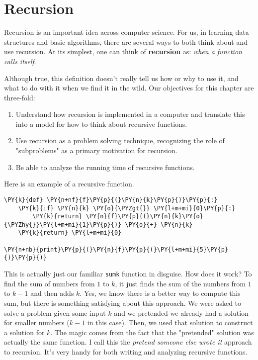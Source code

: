 \chapter{Recursion}


Recursion is an important idea across computer science.
For us, in learning data structures and basic algorithms, there are several ways to both think about and use recursion.
At its simplest, one can think of \textbf{recursion} as: \emph{when a function calls itself}.


Although true, this definition doesn't really tell us how or why to use it, and what to do with it when we find it in the wild.
Our objectives for this chapter are three-fold:

\begin{enumerate}

\item 

Understand how recursion is implemented in a computer and translate this into a model for how to think about recursive functions.



\item 

Use recursion as a problem solving technique, recognizing the role of "subproblems" as a primary motivation for recursion.



\item 

Be able to analyze the running time of recursive functions.



\end{enumerate}

Here is an example of a recursive function.

\begin{Verbatim}[commandchars=\\\{\}]
\PY{k}{def} \PY{n+nf}{f}\PY{p}{(}\PY{n}{k}\PY{p}{)}\PY{p}{:}
    \PY{k}{if} \PY{n}{k} \PY{o}{\PYZgt{}} \PY{l+m+mi}{0}\PY{p}{:}
        \PY{k}{return} \PY{n}{f}\PY{p}{(}\PY{n}{k}\PY{o}{\PYZhy{}}\PY{l+m+mi}{1}\PY{p}{)} \PY{o}{+} \PY{n}{k}
    \PY{k}{return} \PY{l+m+mi}{0}

\PY{n+nb}{print}\PY{p}{(}\PY{n}{f}\PY{p}{(}\PY{l+m+mi}{5}\PY{p}{)}\PY{p}{)}
\end{Verbatim}



This is actually just our familiar \texttt{sumk} function in disguise.
How does it work?
To find the sum of numbers from $1$ to $k$, it just finds the sum of the numbers from $1$ to $k-1$ and then adds $k$.
Yes, we know there is a better way to compute this sum, but there is something satisfying about this approach.
We were asked to solve a problem given some input $k$ and we pretended we already had a solution for smaller numbers ($k-1$ in this case).
Then, we used that solution to construct a solution for $k$.
The magic comes from the fact that the "pretended" solution was actually the same function.
I call this the \emph{pretend someone else wrote it} approach to recursion.
It's very handy for both writing and analyzing recursive functions.

